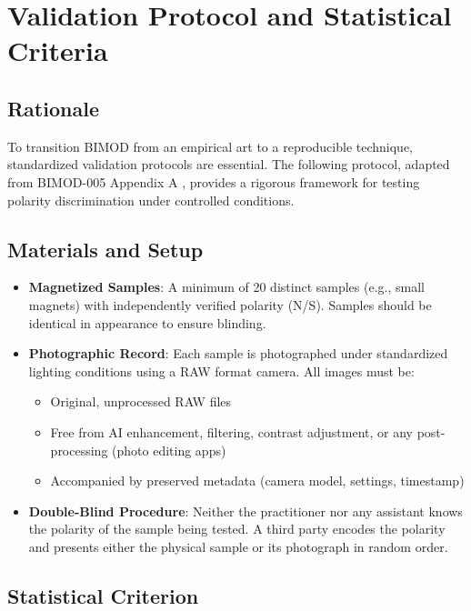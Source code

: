 \documentclass[12pt,a4paper]{article}
\begin{document}
\section{Validation Protocol and Statistical Criteria}

\subsection{Rationale}

To transition BIMOD from an empirical art to a reproducible technique, standardized validation protocols are essential. The following protocol, adapted from BIMOD-005 Appendix A \cite{yoon2026_005}, provides a rigorous framework for testing polarity discrimination under controlled conditions.

\subsection{Materials and Setup}

\begin{itemize}
    \item \textbf{Magnetized Samples}: A minimum of 20 distinct samples (e.g., small magnets) with independently verified polarity (N/S). Samples should be identical in appearance to ensure blinding.
    \item \textbf{Photographic Record}: Each sample is photographed under standardized lighting conditions using a RAW format camera. All images must be:
    \begin{itemize}
        \item Original, unprocessed RAW files
        \item Free from AI enhancement, filtering, contrast adjustment, or any post-processing (photo editing apps)
        \item Accompanied by preserved metadata (camera model, settings, timestamp)
    \end{itemize}
    \item \textbf{Double-Blind Procedure}: Neither the practitioner nor any assistant knows the polarity of the sample being tested. A third party encodes the polarity and presents either the physical sample or its photograph in random order.
\end{itemize}

\subsection{Statistical Criterion}
\end{document}
